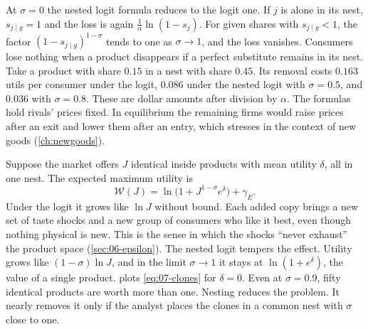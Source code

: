 At $\sigma = 0$ the nested logit formula reduces to the logit one. If $j$ is alone in its nest, $s_{j \mid g} = 1$ and the
loss is again $\frac{1}{\alpha}\ln(1 - s_j)$. For given shares with $s_{j \mid g} < 1$, the factor
$(1 - s_{j \mid g})^{1-\sigma}$ tends to one as $\sigma \to 1$, and the loss vanishes. Consumers lose nothing when a
product disappears if a perfect substitute remains in its nest. Take a product with share $0.15$ in a nest with share
$0.45$. Its removal costs $0.163$ utils per consumer under the logit, $0.086$ under the nested logit with
$\sigma = 0.5$, and $0.036$ with $\sigma = 0.8$. These are dollar amounts after division by $\alpha$. The formulas
hold rivals' prices fixed. In equilibrium the remaining firms would raise prices after an exit and lower them after
an entry, which \citet{Bresnahan1997} stresses in the context of new goods (\cref{ch:newgoods}).

Suppose the market offers $J$ identical inside products with mean utility $\delta$, all in one nest. The expected
maximum utility is
\begin{equation}\label{eq:07-clones}
\mathcal{W}(J) = \ln\big(1 + J^{1-\sigma}e^{\delta}\big) + \gamma_E .
\end{equation}
Under the logit it grows like $\ln J$ without bound. Each added copy brings a new set of taste shocks and a new group of
consumers who like it best, even though nothing physical is new. This is the sense in which the shocks ``never
exhaust'' the product space (\cref{sec:06-epsilon}). The nested logit tempers the effect. Utility grows like
$(1-\sigma)\ln J$, and in the limit $\sigma \to 1$ it stays at $\ln(1 + e^{\delta})$, the value of a single product.
 plots \eqref{eq:07-clones} for $\delta = 0$. Even at $\sigma = 0.9$, fifty identical products are
worth more than one. Nesting reduces the problem. It nearly removes it only if the analyst places the clones in a
common nest with $\sigma$ close to one.

